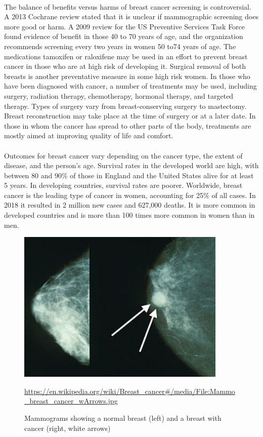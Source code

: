 \documentclass{report}
\begin{document}
\paragraph{} The balance of benefits versus harms of breast cancer screening is controversial. A 2013 Cochrane review stated that it is unclear if mammographic screening does more good or harm. A 2009 review for the US Preventive Services Task Force found evidence of benefit in those 40 to 70 years of age, and the organization recommends screening every two years in women 50 to74 years of age. The medications tamoxifen or raloxifene may be used in an effort to prevent breast cancer in those who are at high risk of developing it. Surgical removal of both breasts is another preventative measure in some high risk women. In those who have been diagnosed with cancer, a number of treatments may be used, including surgery, radiation therapy, chemotherapy, hormonal therapy, and targeted therapy. Types of surgery vary from breast-conserving surgery to mastectomy. Breast reconstruction may take place at the time of surgery or at a later date. In those in whom the cancer has spread to other parts of the body, treatments are mostly aimed at improving quality of life and comfort. 

\paragraph{}Outcomes for breast cancer vary depending on the cancer type, the extent of disease, and the person's age. Survival rates in the developed world are high, with between 80 and 90\% of those in England and the United States alive for at least 5 years. In developing countries, survival rates are poorer. Worldwide, breast cancer is the leading type of cancer in women, accounting for 25\% of all cases. In 2018 it resulted in 2 million new cases and 627,000 deaths. It is more common in developed countries and is more than 100 times more common in women than in men. 
\begin{figure}[ht!]
\centering
\includegraphics[width=100mm]{p1.jpg}
\caption{Mammograms showing a normal breast (left) and a breast with cancer (right, white arrows)\label{overflow}}
{\url{https://en.wikipedia.org/wiki/Breast_cancer#/media/File:Mammo_breast_cancer_wArrows.jpg}}
\end{figure}
\end{document}
